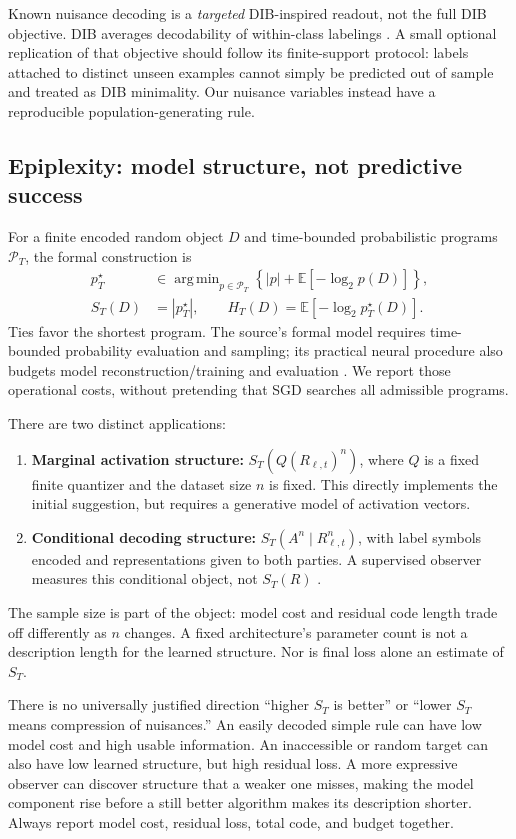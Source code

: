 \documentclass[11pt,a4paper]{article}
\newcommand{\E}{\mathbb E}
\DeclareMathOperator*{\argmin}{arg\,min}
\begin{document}
Known nuisance decoding is a \emph{targeted} DIB-inspired readout, not the full DIB objective. DIB averages decodability of within-class labelings \citep{dubois2020}. A small optional replication of that objective should follow its finite-support protocol: labels attached to distinct unseen examples cannot simply be predicted out of sample and treated as DIB minimality. Our nuisance variables instead have a reproducible population-generating rule.

\subsection{Epiplexity: model structure, not predictive success}
For a finite encoded random object $D$ and time-bounded probabilistic programs $\mathcal P_T$, the formal construction is
\begin{align}
p_T^\star&\in\argmin_{p\in\mathcal P_T}
       \left\{|p|+\E[-\log_2 p(D)]\right\},\\
S_T(D)&=|p_T^\star|,\qquad H_T(D)=\E[-\log_2 p_T^\star(D)].
\label{eq:epi}
\end{align}
Ties favor the shortest program. The source's formal model requires time-bounded probability evaluation and sampling; its practical neural procedure also budgets model reconstruction/training and evaluation \citep[Definitions 7--8; Section 4]{finzi2026}. We report those operational costs, without pretending that SGD searches all admissible programs.

There are two distinct applications:
\begin{enumerate}
\item \textbf{Marginal activation structure:} $S_T(Q(R_{\ell,t})^n)$, where $Q$ is a fixed finite quantizer and the dataset size $n$ is fixed. This directly implements the initial suggestion, but requires a generative model of activation vectors.
\item \textbf{Conditional decoding structure:} $S_T(A^n\mid R_{\ell,t}^n)$, with label symbols encoded and representations given to both parties. A supervised observer measures this conditional object, not $S_T(R)$ \citep[Definition 11]{finzi2026}.
\end{enumerate}
The sample size is part of the object: model cost and residual code length trade off differently as $n$ changes. A fixed architecture's parameter count is not a description length for the learned structure. Nor is final loss alone an estimate of $S_T$.

There is no universally justified direction ``higher $S_T$ is better'' or ``lower $S_T$ means compression of nuisances.'' An easily decoded simple rule can have low model cost and high usable information. An inaccessible or random target can also have low learned structure, but high residual loss. A more expressive observer can discover structure that a weaker one misses, making the model component rise before a still better algorithm makes its description shorter. Always report model cost, residual loss, total code, and budget together.
\end{document}
